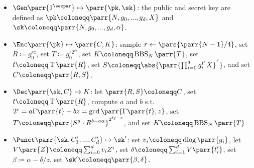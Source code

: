 
\begin{itemize}
    \item \(\Gen\parr{1^\secpar} \mapsto \parr{\pk,\sk}\):
    the public and secret key are defined as \(\pk \coloneqq \parr{N, g_0, ..., g_d, X}\) and \(\sk \coloneqq \parr{N, g_0, ..., g_d, \alpha}\).
    
    \item \(\Enc\parr{\pk} \mapsto \parr{C,K}\):
    sample \(r \gets \pars{\parr{N-1}/4}\),
    set \(R \coloneqq g_0^{r z}\),
    set \(T \coloneqq g_0^{r 2^{\ell_{\mathsf{T}}}}\),
    set \(K \coloneqq \operatorname{BBS}_N\parr{T}\),
    set \(t \coloneqq \operatorname{T}\parr{R}\),
    set \(S \coloneqq \abs{\parr{\prod_{i=0}^d g_i^{t^i} X}^r}\),
    and set \(C \coloneqq \parr{R,S}\).

    \item \(\Dec\parr{\sk,C} \mapsto K\):
    let \(\parr{R,S} \coloneqq C\),
    set \(t \coloneqq \operatorname{T}\parr{R}\),
    compute \(a\) and \(b\) s.t.\ \(2^c = a \Gamma\parr{t} + b z = \gcd\parr{\Gamma\parr{t}, z}\),
    set \(T \coloneqq \parr{S^a \cdot R^{b - a \alpha}}^{2^{\ell_{\mathsf{T}}-c}}\),
    and set \(K \coloneqq \operatorname{BBS}_N\parr{T}\).

    \item \(\Punct\parr{\sk,C'_1,...,C'_d} \mapsto \sk'\):
    set \(v_i \coloneqq \operatorname{dlog}\parr{g_i}\),
    let \(V\parr{Z} \coloneqq \sum_{i=0}^d v_i Z^i\),
    set \(\delta \coloneqq \sum_{i=1}^d V\parr{t'_i}\),
    set \(\beta \coloneqq \alpha - \delta/z\),
    set \(\sk' \coloneqq \parr{\beta, \delta}\).
\end{itemize}